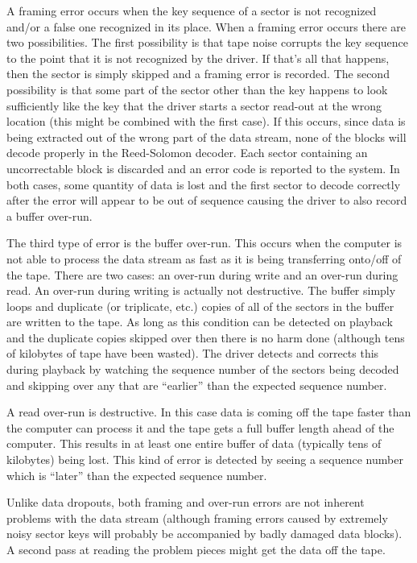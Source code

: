 \documentclass{article}
\begin{document}
A framing error occurs when the key sequence of a sector is not recognized
and/or a false one recognized in its place.  When a framing error occurs
there are two possibilities.  The first possibility is that tape noise
corrupts the key sequence to the point that it is not recognized by the
driver.  If that's all that happens, then the sector is simply skipped and
a framing error is recorded.  The second possibility is that some part of
the sector other than the key happens to look sufficiently like the key
that the driver starts a sector read-out at the wrong location (this might
be combined with the first case).  If this occurs, since data is being
extracted out of the wrong part of the data stream, none of the blocks will
decode properly in the Reed-Solomon decoder.  Each sector containing an
uncorrectable block is discarded and an error code is reported to the
system.  In both cases, some quantity of data is lost and the first sector
to decode correctly after the error will appear to be out of sequence
causing the driver to also record a buffer over-run.

The third type of error is the buffer over-run.  This occurs when the
computer is not able to process the data stream as fast as it is being
transferring onto/off of the tape.  There are two cases:  an over-run
during write and an over-run during read.  An over-run during writing is
actually not destructive.  The buffer simply loops and duplicate (or
triplicate, etc.) copies of all of the sectors in the buffer are written to
the tape.  As long as this condition can be detected on playback and the
duplicate copies skipped over then there is no harm done (although tens of
kilobytes of tape have been wasted).  The driver detects and corrects this
during playback by watching the sequence number of the sectors being
decoded and skipping over any that are ``earlier'' than the expected
sequence number.

A read over-run is destructive.  In this case data is coming off the tape
faster than the computer can process it and the tape gets a full buffer
length ahead of the computer.  This results in at least one entire buffer
of data (typically tens of kilobytes) being lost.  This kind of error is
detected by seeing a sequence number which is ``later'' than the expected
sequence number.

Unlike data dropouts, both framing and over-run errors are not inherent
problems with the data stream (although framing errors caused by extremely
noisy sector keys will probably be accompanied by badly damaged data
blocks).  A second pass at reading the problem pieces might get the data
off the tape.
\end{document}
